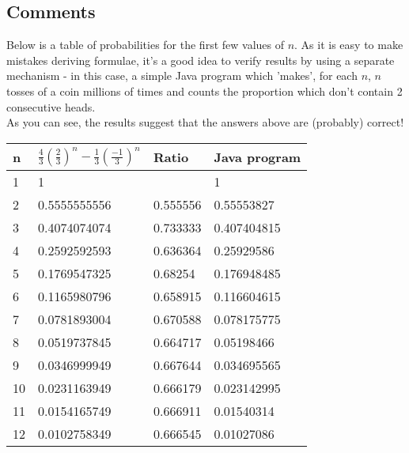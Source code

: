 \subsection{Comments}
Below is a table of probabilities for the first few values of $n$. As it is easy to make mistakes deriving formulae, it's a good idea to verify results by using a separate mechanism - in this case, a simple Java program which
 'makes', for each $n$, $n$ tosses of a coin millions of times and counts the proportion which don't contain 2 consecutive heads. \\
As you can see, the results suggest that the answers above are (probably) correct! \\ 
\begin{table}[!hbp]
\begin{tabular}{|l|l|l|l|}
\hline
\textbf{n} & \textbf{$\frac{4}{3} \left(\frac{2}{3}\right)^n - \frac{1}{3} \left(\frac{-1}{3}\right)^n$} & \textbf{Ratio} & \textbf{Java program} \\ \hline
1          & 1                &                & 1                                 \\ \hline
2          & 0.5555555556     & 0.555556       & 0.55553827                        \\ \hline
3          & 0.4074074074     & 0.733333       & 0.407404815                       \\ \hline
4          & 0.2592592593     & 0.636364       & 0.25929586                        \\ \hline
5          & 0.1769547325     & 0.68254        & 0.176948485                       \\ \hline
6          & 0.1165980796     & 0.658915       & 0.116604615                       \\ \hline
7          & 0.0781893004     & 0.670588       & 0.078175775                       \\ \hline
8          & 0.0519737845     & 0.664717       & 0.05198466                        \\ \hline
9          & 0.0346999949     & 0.667644       & 0.034695565                       \\ \hline
10         & 0.0231163949     & 0.666179       & 0.023142995                       \\ \hline
11         & 0.0154165749     & 0.666911       & 0.01540314                        \\ \hline
12         & 0.0102758349     & 0.666545       & 0.01027086                        \\ \hline
\end{tabular}
\end{table}

